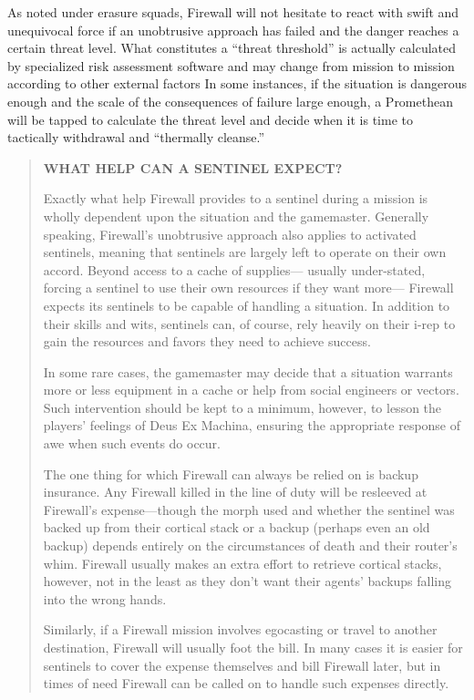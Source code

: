 As noted under erasure squads, Firewall will not hesitate to react with swift and unequivocal force if an unobtrusive approach has failed and the danger reaches a certain threat level. What constitutes a ``threat threshold'' is actually calculated by specialized risk assessment software and may change from mission to mission according to other external factors In some instances, if the situation is dangerous enough and the scale of the consequences of failure large enough, a Promethean will be tapped to calculate the threat level and decide when it is time to tactically withdrawal and ``thermally cleanse.'' 

\begin{quotation} \begin{large} \textbf{WHAT HELP CAN A SENTINEL EXPECT?} \end{large} 

Exactly what help Firewall provides to a sentinel during a mission is wholly dependent upon the situation and the gamemaster. Generally speaking, Firewall’s unobtrusive approach also applies to activated sentinels, meaning that sentinels are largely left to operate on their own accord. Beyond access to a cache of supplies— usually under-stated, forcing a sentinel to use their own resources if they want more— Firewall expects its sentinels to be capable of handling a situation. In addition to their skills and wits, sentinels can, of course, rely heavily on their i-rep to gain the resources and favors they need to achieve success. 

In some rare cases, the gamemaster may decide that a situation warrants more or less equipment in a cache or help from social engineers or vectors. Such intervention should be kept to a minimum, however, to lesson the players’ feelings of Deus Ex Machina, ensuring the appropriate response of awe when such events do occur. 

The one thing for which Firewall can always be relied on is backup insurance. Any Firewall killed in the line of duty will be resleeved at Firewall’s expense—though the morph used and whether the sentinel was backed up from their cortical stack or a backup (perhaps even an old backup) depends entirely on the circumstances of death and their router’s whim. Firewall usually makes an extra effort to retrieve cortical stacks, however, not in the least as they don’t want their agents’ backups falling into the wrong hands. 

Similarly, if a Firewall mission involves egocasting or travel to another destination, Firewall will usually foot the bill. In many cases it is easier for sentinels to cover the expense themselves and bill Firewall later, but in times of need Firewall can be called on to handle such expenses directly. \end{quotation} 



